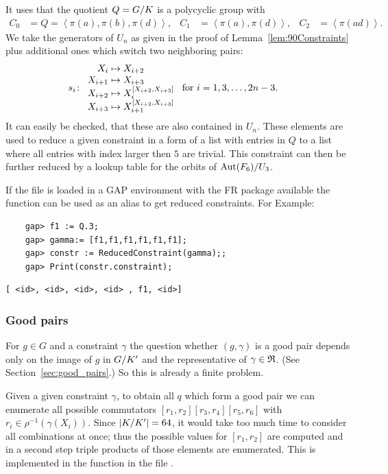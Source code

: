 \documentclass[a4paper,11pt]{amsart}
\begin{document}
It uses that the quotient $Q={G/K}$ is a polycyclic group with 
\begin{align*}
 C_0 &= Q = \left<\pi(a),\pi(b),\pi(d)\right>, &
 C_1 &= \left<\pi(a),\pi(d)\right>, &
 C_2 &= \left<\pi(ad)\right>.
\end{align*}
We take the generators of $U_n$ as given in the proof of
 Lemma~\ref{lem:90Constraints}
plus additional ones which switch two neighboring pairs:
\begin{align*}
  s_i &\colon\begin{array}{r@{\;}l}
               X_i&\mapsto X_{i+2}\\
               X_{i+1}&\mapsto X_{i+3}\\
               X_{i+2}&\mapsto X_{i}^{[X_{i+2},X_{i+3}]}\\
               X_{i+3}&\mapsto X_{i+1}^{[X_{i+2},X_{i+3}]}
             \end{array}
                   \textup{ for }i = 1,3,\dotsc,2n-3.
\end{align*}
It can easily be checked, that these are also contained in $U_n$. 
These elements are used to reduce a given constraint in a form of 
a list with entries in $Q$ to a
list where all entries with index larger then $5$ are trivial. 
This constraint can then be further reduced by a lookup table for the orbits
of ${\operatorname{{Aut}}(F_6)/U_3}$. 

If the file  is loaded in a GAP environment with the FR package available 
the function  can be used as an alias to get 
reduced constraints. For Example:
 \begin{lstlisting}
    gap> f1 := Q.3;
    gap> gamma:= [f1,f1,f1,f1,f1,f1];
    gap> constr := ReducedConstraint(gamma);;
    gap> Print(constr.constraint);
\end{lstlisting} 
\begin{verbatim}
[ <id>, <id>, <id>, <id> , f1, <id>]
\end{verbatim} 

\subsubsection{Good pairs}
For $g\in G$ and a constraint $\gamma$ the question whether $(g,\gamma)$ is a good
pair depends only on the image of $g$ in ${G/K'}$ and the representative
of $\gamma\in\mathfrak{R}$. (See Section~\ref{sec:good_pairs}.) So this is already a
finite problem. 

Given a given constraint $\gamma$, to obtain all $q$ which form a good
pair we can enumerate all possible commutators
$[r_1,r_2][r_3,r_4][r_5,r_6]$ with $r_i\in\rho^{-1}(\gamma(X_i))$.
Since $\lvert{K/K'}\rvert=64$, it would take too much time to
consider all combinations at once; thus the possible values for
$[r_1,r_2]$ are computed and in a second step triple products of those
elements are enumerated.  This is implemented in the function
 in the file .
\end{document}
